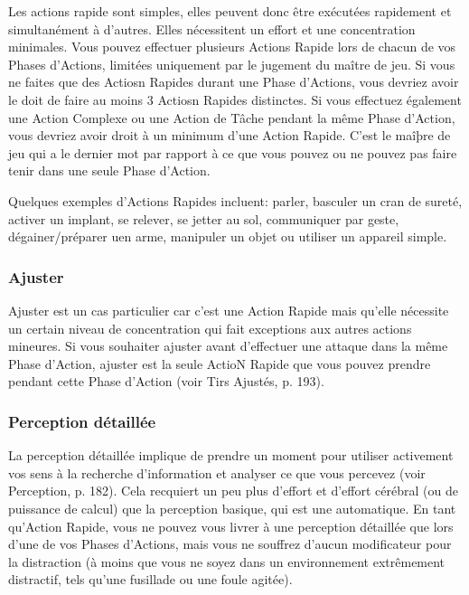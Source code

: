 Les actions rapide sont simples, elles peuvent donc être exécutées rapidement et simultanément à d'autres. Elles nécessitent un effort et une concentration minimales. Vous pouvez effectuer plusieurs Actions Rapide lors de chacun de vos Phases d'Actions, limitées uniquement par le jugement du maître de jeu. Si vous ne faites que des Actiosn Rapides durant une Phase d'Actions, vous devriez avoir le doit de faire au moins 3 Actiosn Rapides distinctes. Si vous effectuez également une Action Complexe ou une Action de Tâche pendant la même Phase d'Action, vous devriez avoir droit à un minimum d'une Action Rapide. C'est le maîþre de jeu qui a le dernier mot par rapport à ce que vous pouvez ou ne pouvez pas faire tenir dans une seule Phase d'Action. 

Quelques exemples d'Actions Rapides incluent: parler, basculer un cran de sureté, activer un implant, se relever, se jetter au sol, communiquer par geste, dégainer/préparer uen arme, manipuler un objet ou utiliser un appareil simple. 

\subsubsection{Ajuster} 

Ajuster est un cas particulier car c'est une Action Rapide mais qu'elle nécessite un certain niveau de concentration qui fait exceptions aux autres actions mineures. Si vous souhaiter ajuster avant d'effectuer une attaque dans la même Phase d'Action, ajuster est la seule ActioN Rapide que vous pouvez prendre pendant cette Phase d'Action (voir Tirs Ajustés, p. 193). 

\subsubsection{Perception détaillée} 

La perception détaillée implique de prendre un moment pour utiliser activement vos sens à la recherche d'information et analyser ce que vous percevez (voir Perception, p. 182). Cela recquiert un peu plus d'effort et d'effort cérébral (ou de puissance de calcul) que la perception basique, qui est une automatique. En tant qu'Action Rapide, vous ne pouvez vous livrer à une perception détaillée que lors d'une de vos Phases d'Actions, mais vous ne souffrez d'aucun modificateur pour la distraction (à moins que vous ne soyez dans un environnement extrêmement distractif, tels qu'une fusillade ou une foule agitée). 

